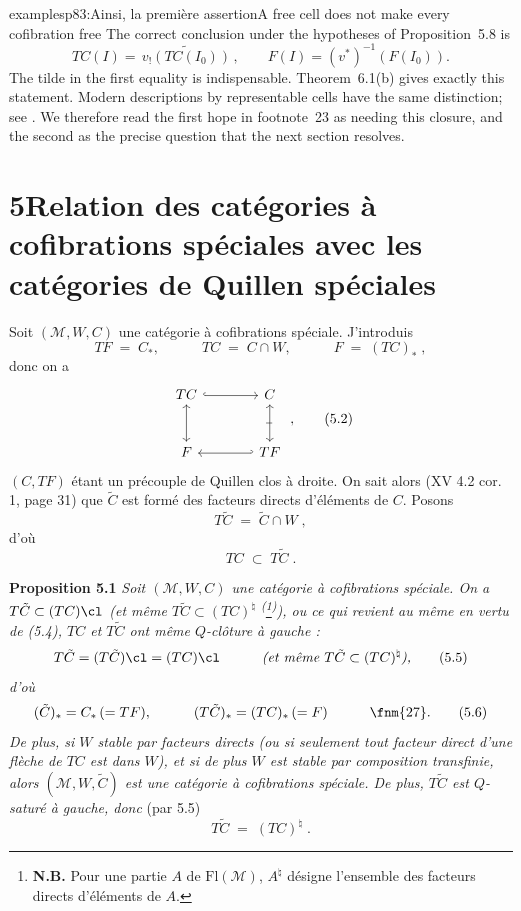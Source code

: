 \begin{dcomment}{examples}{p83:Ainsi, la première assertion}{A free cell does not make every cofibration free}
The correct conclusion under the hypotheses of Proposition~5.8 is
\[
 TC(I)=\widetilde{\,v_!(TC(I_0))\,},
 \qquad F(I)=(v^*)^{-1}(F(I_0)).
\]
The tilde in the first equality is indispensable. Theorem~6.1(b) gives exactly this statement. Modern descriptions by representable cells have the same distinction; see \citet[Theorem~12.3.2]{Riehl2014}. We therefore read the first hope in footnote~23 as needing this closure, and the second as the precise question that the next section resolves.
\end{dcomment}



\section*{5\quad Relation des catégories à cofibrations spéciales avec les catégories de Quillen spéciales}

Soit $(\mathcal{M}, W, C)$ une catégorie à cofibrations spéciale. J'introduis
\[
TF \;=\; C_{*}, \qquad\quad TC \;=\; C \cap W, \qquad\quad F \;=\; (TC)_{*} \; ,
\tag*{(5.1)}
\]
donc on a
\[
\begin{tikzcd}[row sep=large, column sep=large]
TC \arrow[r, hook] \arrow[d, leftrightarrow] & C \arrow[d, leftrightarrow, "\shortmid"{marking, sloped}] \\
F & TF \arrow[l, hook']
\end{tikzcd} \; ,
\tag*{(5.2)}
\]
$(C, TF)$ étant un précouple de Quillen clos à droite. On sait alors (XV 4.2 cor. 1, page 31) que $\tilde{C}$ est formé des facteurs directs d'éléments de $C$. Posons
\[
T\tilde{C} \;=\; \tilde{C} \cap W \; ,
\tag*{(5.3)}
\]
d'où
\[
TC \;\subset\; T\tilde{C} \; .
\tag*{(5.4)}
\]

\textbf{Proposition 5.1} \textit{Soit $(\mathcal{M}, W, C)$ une catégorie à cofibrations spéciale. On a $T\tilde{C} \subset (TC)\cl$ (et même $T\tilde{C} \subset (TC)^{\natural}$ \textsuperscript{(}\footnote[26]{\textbf{N.B.} Pour une partie $A$ de $\mathrm{Fl}(\mathcal{M})$, $A^{\natural}$ désigne l'ensemble des facteurs directs d'éléments de $A$.}\textsuperscript{)}), ou ce qui revient au même en vertu de (5.4), $TC$ et $T\tilde{C}$ ont même $Q$-clôture à gauche :}
\[
T\tilde{C} = (T\tilde{C})\cl = (TC)\cl \qquad\quad \textit{(et même } T\tilde{C} \subset (TC)^{\natural}\textit{),}
\tag*{(5.5)}
\]
\textit{d'où}
\[
(\tilde{C})_{*} = C_{*} \, (= TF), \qquad\quad (T\tilde{C})_{*} = (TC)_{*} \, (= F) \qquad\quad \text{\fnm{27}}.
\tag*{(5.6)}
\]
\textit{De plus, si $W$ stable par facteurs directs (ou si seulement tout facteur direct d'une flèche de $TC$ est dans $W$), et si de plus $W$ est stable par composition transfinie, alors $(\mathcal{M}, W, \tilde{C})$ est une catégorie à cofibrations spéciale. De plus, $T\tilde{C}$ est $Q$-saturé à gauche, donc} (par 5.5)
\[
T\tilde{C} \;=\; (TC)^{\natural} \; .
\tag*{(5.7)}
\]

